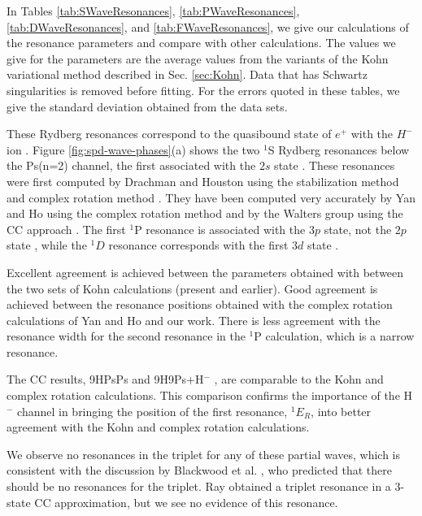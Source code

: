 \documentclass[preprint,showpacs,preprintnumbers,amsmath,amssymb]{revtex4}
\begin{document}
In Tables \ref{tab:SWaveResonances}, \ref{tab:PWaveResonances}, \ref{tab:DWaveResonances}, and \ref{tab:FWaveResonances}, we give our calculations of the resonance parameters and compare with other calculations. The values we give for the parameters are the average values from the variants of the Kohn variational method described in Sec. \ref{sec:Kohn}. Data that has Schwartz singularities is removed before fitting. For the errors quoted in these tables, we give the standard deviation obtained from the data sets.

These Rydberg resonances correspond to the quasibound state of $e^+$ with the $H^-$ ion \cite{Drachman1979}.
Figure \ref{fig:spd-wave-phases}(a) shows the two $^1$S Rydberg resonances below the
Ps(n=2) channel, the first associated with the $2s$ state \cite{DiRienzi2002b}.
These resonances were first computed by Drachman and Houston using the stabilization
method and complex rotation method \cite{Drachman1975}. They have been computed very accurately by Yan and Ho
using the complex rotation method \cite{Yan1999} and by the Walters group using the CC approach \cite{Walters2004}. The first $^1$P resonance is associated with the $3p$ state, not the $2p$ state \cite{DiRienzi2002b}, while the $^1D$ resonance corresponds with the first $3d$ state \cite{DiRienzi2002a}.

Excellent agreement is achieved between the parameters obtained with between the two sets of Kohn calculations (present and earlier). Good agreement is achieved between the resonance positions obtained with the complex rotation calculations of Yan and Ho \cite{Yan1999,Yan1998a,Ho1998,Ho2000} and our work. There is less agreement with the resonance width for the second resonance in the $^1$P calculation, which is a narrow resonance. 

The CC results, 9HPsPs \cite{Blackwood2002} and 9H9Ps+H$^-$ \cite{Walters2004}, are comparable to the Kohn and complex rotation calculations. This comparison confirms the importance of the H$^-$ channel in bringing the position of the first resonance, $^1E_R$, into better agreement with the Kohn and complex rotation calculations.

We observe no resonances in the triplet for any of these partial waves, which is consistent with the discussion by Blackwood et al. \cite{Blackwood2002}, who predicted that there should be no resonances for the triplet. Ray \cite{Ray2006} obtained a triplet resonance in a 3-state CC approximation, but we see no evidence of this resonance.
\end{document}
